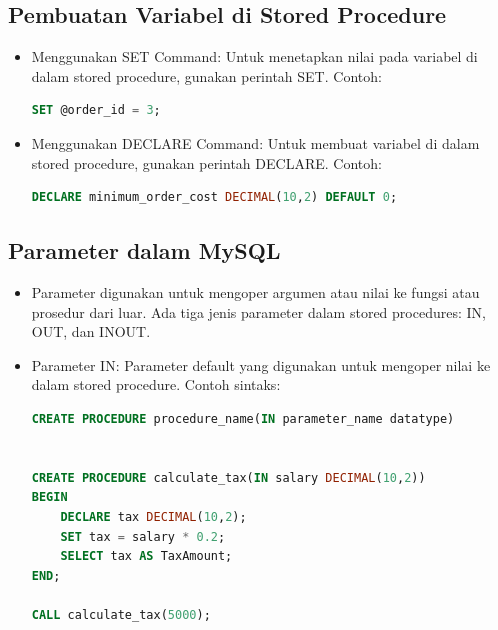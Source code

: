 \documentclass{article}
\begin{document}
\subsection{Pembuatan Variabel di Stored Procedure}
\begin{itemize}
    \item Menggunakan SET Command: Untuk menetapkan nilai pada variabel di dalam stored procedure, gunakan perintah SET. Contoh:
          \begin{lstlisting}[language=SQL, caption={}, captionpos=b]
SET @order_id = 3;
\end{lstlisting}
    \item Menggunakan DECLARE Command: Untuk membuat variabel di dalam stored procedure, gunakan perintah DECLARE. Contoh:
          \begin{lstlisting}[language=SQL, caption={}, captionpos=b]
DECLARE minimum_order_cost DECIMAL(10,2) DEFAULT 0;
\end{lstlisting}
\end{itemize}

\subsection{Parameter dalam MySQL}
\begin{itemize}
    \item Parameter digunakan untuk mengoper argumen atau nilai ke fungsi atau prosedur dari luar. Ada tiga jenis parameter dalam stored procedures: IN, OUT, dan INOUT.
    \item Parameter IN: Parameter default yang digunakan untuk mengoper nilai ke dalam stored procedure. Contoh sintaks:
          \begin{lstlisting}[language=SQL, caption={}, captionpos=b]
CREATE PROCEDURE procedure_name(IN parameter_name datatype)


CREATE PROCEDURE calculate_tax(IN salary DECIMAL(10,2))  
BEGIN  
	DECLARE tax DECIMAL(10,2);  
	SET tax = salary * 0.2; 
	SELECT tax AS TaxAmount;  
END;

CALL calculate_tax(5000);
\end{lstlisting}
\end{itemize}
\end{document}
